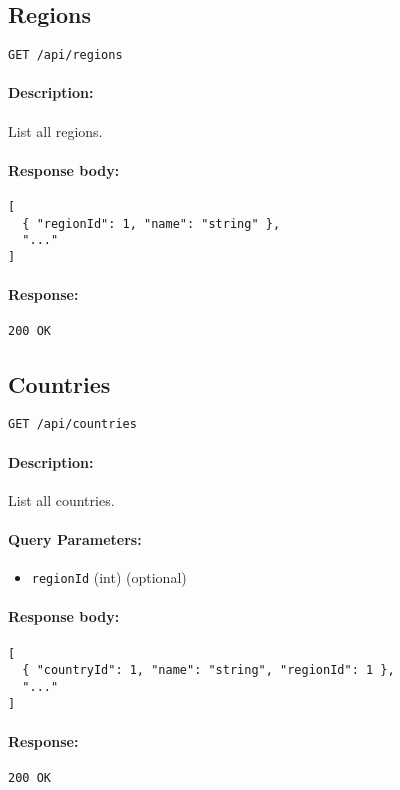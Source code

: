 \documentclass[a4paper,11pt]{article}
\begin{document}
\subsection{Regions}
\label{sec:geography-regions}
\begin{verbatim}
GET /api/regions
\end{verbatim}
\paragraph{Description:} List all regions.
\paragraph{Response body:}
\begin{verbatim}
[
  { "regionId": 1, "name": "string" },
  "..."
]
\end{verbatim}
\paragraph{Response:} \texttt{200 OK}

\subsection{Countries}
\label{sec:geography-countries}
\begin{verbatim}
GET /api/countries
\end{verbatim}
\paragraph{Description:} List all countries.
\paragraph{Query Parameters:}
\begin{itemize}
  \item \texttt{regionId} (int) (optional)
\end{itemize}
\paragraph{Response body:}
\begin{verbatim}
[
  { "countryId": 1, "name": "string", "regionId": 1 },
  "..."
]
\end{verbatim}
\paragraph{Response:} \texttt{200 OK}
\end{document}
